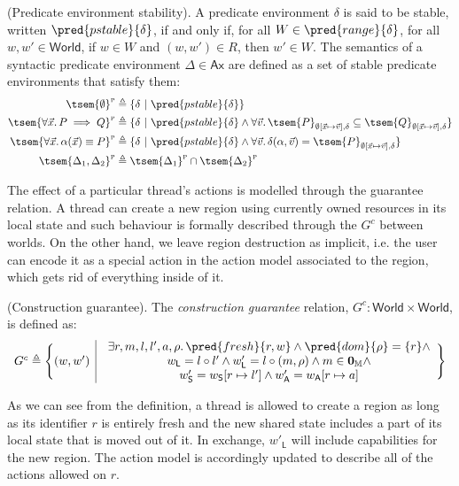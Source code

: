 \begin{defn}
	(Predicate environment stability).
	A predicate environment $\delta$ is said to be stable, written $\pred{pstable}{\delta}$, if and only if, for all $W \in \pred{range}{\delta}$, for all $w, w' \in \mathsf{World}$, if $w \in W$ and $(w, w') \in R$, then $w' \in W$. The semantics of a syntactic predicate environment $\Delta \in \mathsf{Ax}$ are defined as a set of stable predicate environments that satisfy them:
	\begin{align*}
		\tsem{\emptyset}^\textsc{p} &\triangleq \{ \delta\ |\ \pred{pstable}{\delta} \} \\
		\tsem{\forall \vec{x} \ldotp P \implies Q}^\textsc{p} &\triangleq \{ \delta\ |\ \pred{pstable}{\delta} \land \forall \vec{v} \ldotp \tsem{P}_{\emptyset[\vec{x} \mapsto \vec{v}], \delta} \subseteq \tsem{Q}_{\emptyset[\vec{x} \mapsto \vec{v}], \delta} \} \\
		\tsem{\forall \vec{x} \ldotp \alpha(\vec{x}) \equiv P}^\textsc{p} &\triangleq \{ \delta\ |\ \pred{pstable}{\delta} \land \forall \vec{v} \ldotp \delta(\alpha, \vec{v}) = \tsem{P}_{\emptyset[\vec{x} \mapsto \vec{v}], \delta} \} \\
		\tsem{\Delta_1, \Delta_2}^\textsc{p} &\triangleq \tsem{\Delta_1}^\textsc{p} \cap \tsem{\Delta_2}^\textsc{p}
	\end{align*}
\end{defn}

The effect of a particular thread's actions is modelled through the guarantee relation. A thread can create a new region using currently owned resources in its local state and such behaviour is formally described through the $G^c$ between worlds. On the other hand, we leave region destruction as implicit, i.e. the user can encode it as a special action in the action model associated to the region, which gets rid of everything inside of it.
\begin{defn}
	(Construction guarantee).
	The \emph{construction guarantee} relation, $G^c : \mathsf{World} \times \mathsf{World}$, is defined as:
	\[
	\begin{array}{r | l}
		G^c \triangleq \Bigg\{ (w, w')
		&
		\begin{array}{c}
			\exists r, m, l, l', a, \rho \ldotp \pred{fresh}{r, w} \land \pred{dom}{\rho} = \{r\} \land
			\\
			w_\mathsf{L} = l \circ l' \land w'_\mathsf{L} = l \circ (m, \rho) \land m \in \mathbf{0}_\mathbb{M} \land
			\\
			w'_\mathsf{S} = w_\mathsf{S}[r \mapsto l'] \land w'_\mathsf{A} = w_\mathsf{A}[r \mapsto a]
		\end{array}
		\Bigg\}
	\end{array}
	\]
\end{defn}
As we can see from the definition, a thread is allowed to create a region as long as its identifier $r$ is entirely fresh and the new shared state includes a part of its local state that is moved out of it. In exchange, $w'_\mathsf{L}$ will include capabilities for the new region. The action model is accordingly updated to describe all of the actions allowed on $r$.

